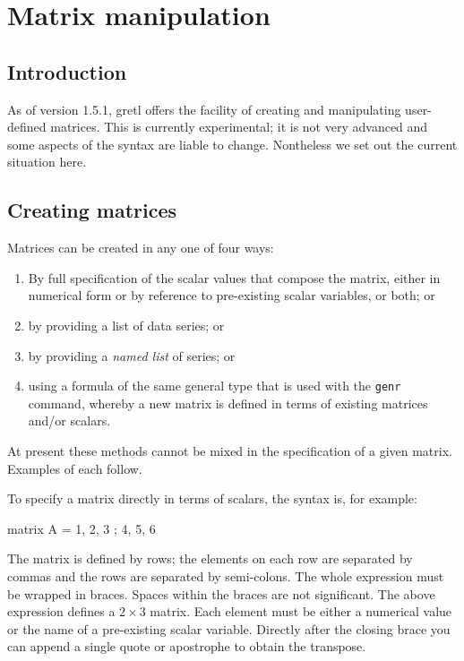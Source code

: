 \chapter{Matrix manipulation}
\label{chap-matrices}

\section{Introduction}
\label{matrix-intro}

As of version 1.5.1, gretl offers the facility of creating and
manipulating user-defined matrices.  This is currently experimental;
it is not very advanced and some aspects of the syntax are liable to
change.  Nontheless we set out the current situation here.

\section{Creating matrices}
\label{matrix-create}

Matrices can be created in any one of four ways:

\begin{enumerate}
\item By full specification of the scalar values that compose the
  matrix, either in numerical form or by reference to pre-existing
  scalar variables, or both; or
\item by providing a list of data series; or
\item by providing a \textit{named list} of series; or
\item using a formula of the same general type that is used
  with the \texttt{genr} command, whereby a new matrix is defined
  in terms of existing matrices and/or scalars.
\end{enumerate}

At present these methods cannot be mixed in the specification of a
given matrix.  Examples of each follow.

To specify a matrix directly in terms of scalars, the syntax is,
for example: 

\begin{code}
matrix A = { 1, 2, 3 ; 4, 5, 6 }
\end{code}

The matrix is defined by rows; the elements on each row are separated
by commas and the rows are separated by semi-colons.  The whole
expression must be wrapped in braces.  Spaces within the braces are
not significant.  The above expression defines a $2\times3$ matrix.
Each element must be either a numerical value or the name of a
pre-existing scalar variable.  Directly after the closing brace you
can append a single quote or apostrophe to obtain the transpose.

